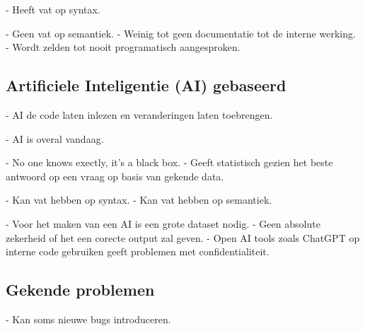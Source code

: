 - Heeft vat op syntax.


- Geen vat op semantiek.
- Weinig tot geen documentatie tot de interne werking.
- Wordt zelden tot nooit programatisch aangesproken.

\subsection{Artificiele Inteligentie (AI) gebaseerd}
\label{ch:stand-van-zaken:refactoring:ai}


- AI de code laten inlezen en veranderingen laten toebrengen.


- AI is overal vandaag.


- No one knows exectly, it's a black box.
- Geeft statistisch gezien het beste antwoord op een vraag op basis van gekende data.


- Kan vat hebben op syntax.
- Kan vat hebben op semantiek.


- Voor het maken van een AI is een grote dataset nodig.
- Geen absolute zekerheid of het een corecte output zal geven.
- Open AI tools zoals ChatGPT op interne code gebruiken geeft problemen met confidentialiteit.

\subsection{Gekende problemen}
\label{ch:stand-van-zaken:refactoring:known-problems}


- Kan soms nieuwe bugs introduceren.









